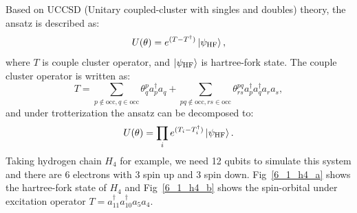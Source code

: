 Based on UCCSD (Unitary coupled-cluster with singles and doubles) theory, the ansatz is described as:
\begin{equation}
    U(\theta) = e^{(T-T^\dagger)}\ket{\psi_\text{HF}},
\end{equation}
where $T$ is couple cluster operator, and $\ket{\psi_\text{HF}}$ is hartree-fork state. The couple cluster operator is written as:
\begin{equation}
    T=\sum_{p\notin\text{occ},q\in\text{occ}}\theta_q^p a_p^\dagger a_q + \sum_{pq\notin\text{occ},rs\in\text{occ}}\theta_{rs}^{pq}a_p^\dagger a_q^\dagger a_r a_s,
\end{equation}
and under trotterization the ansatz can be decomposed to:
\begin{equation}
    U(\theta)=\prod_ie^{(T_i-T_i^\dagger)}\ket{\psi_\text{HF}}.
\end{equation}
Taking hydrogen chain $H_4$ for example, we need 12 qubits to simulate this system and there are 6 electrons with 3 spin up and 3 spin down. Fig~\ref{6_1_h4_a} shows the hartree-fork state of $H_4$ and Fig~\ref{6_1_h4_b} shows the spin-orbital under excitation operator $T=a_{11}^\dagger a_{10}^\dagger a_5 a_4$.
